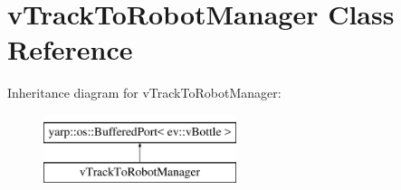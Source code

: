 \hypertarget{classvTrackToRobotManager}{}\section{v\+Track\+To\+Robot\+Manager Class Reference}
\label{classvTrackToRobotManager}
Inheritance diagram for v\+Track\+To\+Robot\+Manager\+:\begin{figure}[H]
\begin{center}
\leavevmode
\includegraphics[height=2.000000cm]{classvTrackToRobotManager}
\end{center}
\end{figure}
